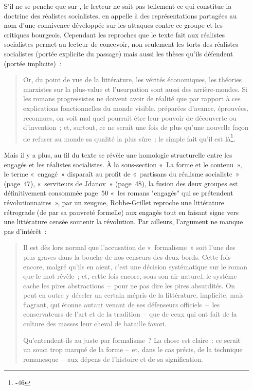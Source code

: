\documentclass[12pt, a4paper]{article}
\begin{document}
S'il ne se penche que sur \punr{}, le lecteur ne sait pas tellement ce qui constitue la doctrine des réalistes socialistes, \robbe{} en appelle à des représentations partagées au nom d'une connivence développée sur les attaques contre ce groupe et les critiques bourgeois. Cependant les reproches que le texte fait aux réalistes socialistes permet au lecteur de concevoir, non seulement les torts des réalistes socialistes (portée explicite du passage) mais aussi les thèses qu'ils défendent (portée implicite)~:
\begin{quote}
Or, du point de vue de la littérature, les vérités économiques, les théories marxistes sur la plus-value et l’usurpation sont aussi des arrière-mondes. Si les romans progressistes ne doivent avoir de réalité que par rapport à ces explications fonctionnelles du monde visible, préparées d’avance, éprouvées, reconnues, on voit mal quel pourrait être leur pouvoir de découverte ou d’invention~; et, surtout, ce ne serait une fois de plus qu’une nouvelle façon de refuser au monde sa qualité la plus sûre~: le simple fait qu’il est là\footnote{-46}.
\end{quote}
Mais il y a plus, au fil du texte se révèle une homologie structurelle entre les engagés et les réalistes socialistes. À la sous-section %
«~La forme et le contenu~», le terme «~engagé~» disparaît au profit de «~partisans du réalisme socialiste~» (page~47), «~serviteurs de Jdanov~» (page~48), la fusion des deux groupes est définitivement consommée page~50 «~les romans "engagés" qui se prétendent révolutionnaires~», par un zeugme, Robbe-Grillet reproche une littérature rétrograde (de par sa pauvreté formelle) aux engagés tout en faisant signe vers une littérature censée soutenir la révolution. Par ailleurs, l'argument ne manque pas d'intérêt~: 
\begin{quote}
    Il est dès lors normal que l’accusation de «~formalisme~» soit l’une des plus graves dans la bouche de nos censeurs des deux bords. Cette fois encore, malgré qu’ils en aient, c’est une décision systématique sur le roman que le mot révèle~; et, cette fois encore, sous son air naturel, le système cache les pires abstractions~–~pour ne pas dire les pires absurdités. On peut en outre y déceler un certain mépris de la littérature, implicite, mais flagrant, qui étonne autant venant de ses défenseurs officiels~–~les conservateurs de l’art et de la tradition~– que de ceux qui ont fait de la culture des masses leur cheval de bataille favori.

    Qu’entendent-ils au juste par formalisme~? La chose est claire~: ce serait un souci trop marqué de la forme –~et, dans le cas précis, de la technique romanesque~– aux dépens de l’histoire et de sa signification.
\end{quote}
\end{document}
